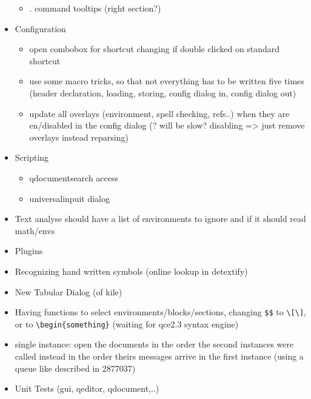 \documentclass[10pt,a4paper,landscape]{report}
\begin{document}
\begin{itemize}
\begin{itemize}
		\item . command tooltips (right section?)
	\end{itemize}
	\item Configuration \begin{itemize}
		\item open combobox for shortcut changing if double clicked on standard shortcut
		\item use some macro tricks, so that not everything has to be written five times (header declaration, loading, storing, config dialog in, config dialog out)
		\item update all overlays (environment, spell checking, refs..) when they are en/disabled in the config dialog (? will be slow? disabling => just remove overlays instead reparsing)
	\end{itemize} 
	\item  Scripting
	\begin{itemize}
	\item qdocumentsearch access
	\item universalinpuit dialog
	\end{itemize}
	\item Text analyse should have a list of environments to ignore and if it should read math/envs
	\item Plugins
	\item Recognizing hand written symbols (online lookup in detextify)
	\item New Tabular Dialog (of kile)
	\item Having functions to select environments/blocks/sections, changing \verb+$$+ to \verb+\[\]+, or to \verb+\begin{something}+ (waiting for qce2.3 syntax engine)
	\item single instance: open the documents in the order the second instances were called instead in the order theirs messages arrive in the first instance (using a queue like described in 2877037)
	\item Unit Tests (gui, qeditor, qdocument,..)
\end{itemize}
\end{document}
